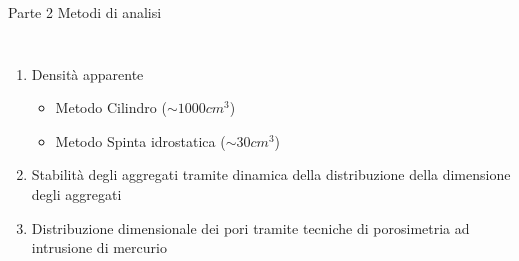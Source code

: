\documentclass[10pt]{beamer}
\begin{document}
\begin{frame}{Parte 2 \small{Metodi di analisi}}
  \begin{columns}[c]
    \begin{enumerate}[<+->]
    \item Densit\`a apparente
      \begin{itemize}
      \item Metodo Cilindro ($\sim 1000 cm^3$)
        \pause
      \item Metodo Spinta idrostatica ($\sim 30 cm^3$)
        \pause
      \end{itemize}
    \item Stabilit\`a degli aggregati tramite dinamica della
      distribuzione della dimensione degli aggregati
    \item Distribuzione dimensionale dei pori tramite tecniche di
      porosimetria ad intrusione di mercurio      
    \end{enumerate}

\end{columns}
\end{frame}
\end{document}
